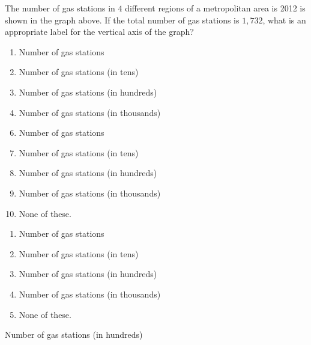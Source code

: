  
\begin{center}
\end{center}

The number of gas stations in $4$ different regions of a metropolitan area is 2012 is shown in the graph above.  If the total number of gas stations is $1,732$, what is an appropriate label for the vertical axis of the graph?



\ifsat
	\begin{enumerate}[label=\Alph*)]
		\item  Number of gas stations 
		\item  Number of gas stations (in tens)
		\item  Number of gas stations (in hundreds) %
		\item  Number of gas stations (in thousands)
	\end{enumerate}
\else
\fi

\ifacteven
	\begin{enumerate}[label=\textbf{\Alph*.},itemsep=\fill,align=left]
		\setcounter{enumii}{5}
		\item  Number of gas stations 
		\item  Number of gas stations (in tens)
		\item  Number of gas stations (in hundreds) %
		\addtocounter{enumii}{1}
		\item  Number of gas stations (in thousands)
		\item None of these. 
	\end{enumerate}
\else
\fi

\ifactodd
	\begin{enumerate}[label=\textbf{\Alph*.},itemsep=\fill,align=left]
		\item  Number of gas stations 
		\item  Number of gas stations (in tens)
		\item  Number of gas stations (in hundreds) %
		\item  Number of gas stations (in thousands)
		\item None of these. 
	\end{enumerate}
\else
\fi

\ifgridin
  Number of gas stations (in hundreds) %
		
\else
\fi

